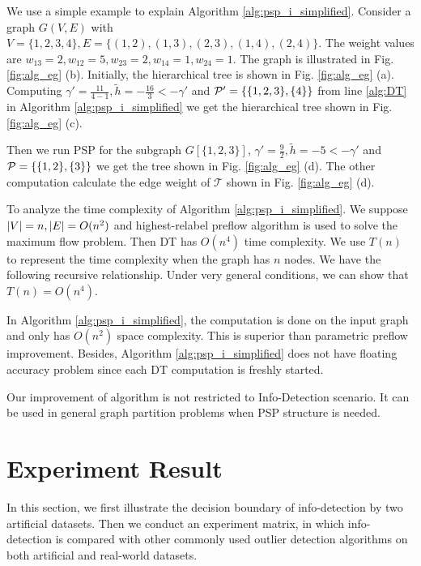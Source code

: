 \documentclass[runningheads]{llncs}
\begin{document}
\begin{example}
	We use a simple example to explain Algorithm \ref{alg:psp_i_simplified}. Consider a graph $G(V, E)$ with $V=\{1,2,3,4\}, E=\{(1,2),(1,3),(2,3),(1,4),(2,4)\}$. The weight values are $w_{13}=2, w_{12}=5, w_{23}=2, w_{14}=1, w_{24}=1$. The graph is illustrated
	in Fig. \ref{fig:alg_eg} (b). Initially, the hierarchical tree is shown in Fig. \ref{fig:alg_eg} (a). Computing $\gamma' = \frac{11}{4-1}, \tilde{h} = -\frac{16}{3} < -\gamma' $ and $\P' = \{\{1,2,3\},\{4\}\}$ from line \ref {alg:DT} in Algorithm \ref{alg:psp_i_simplified} we get the hierarchical tree shown in Fig. \ref{fig:alg_eg} (c).
	
	Then we run PSP for the subgraph $G[\{1,2,3\}]$, $\gamma' = \frac{9}{2}, \tilde{h} = -5 < -\gamma'$ and $\P= \{\{1,2\},\{3\}\}$ we get the tree shown in Fig. \ref{fig:alg_eg} (d). The other computation calculate the edge weight of $\mathcal{T}$ shown in Fig. \ref{fig:alg_eg} (d).
\end{example}		

To analyze the time complexity of Algorithm \ref{alg:psp_i_simplified}. We suppose $\abs{V} = n, \abs{E} = O(n^2)$ and highest-relabel preflow algorithm is used to solve the maximum flow problem. Then DT has $O(n^4)$ time complexity. 
We use $T(n)$ to represent the time complexity when the graph has $n$ nodes. We have the following recursive relationship. Under very general conditions, we can show that $T(n) = O(n^4)$. 

In Algorithm \ref{alg:psp_i_simplified}, the computation is done on the input graph and only has $O(n^2)$ space complexity. This is superior than parametric preflow improvement. Besides, Algorithm \ref{alg:psp_i_simplified} does not have floating accuracy problem since each DT computation is freshly started. 

Our improvement of algorithm is not restricted to Info-Detection scenario. It can be used in general graph partition problems when PSP structure is needed.

\section{Experiment Result}\label{sec:Experiemt}
In this section, we first illustrate the decision boundary of info-detection by two artificial datasets. Then we conduct an experiment matrix, in which info-detection is compared with other commonly used outlier detection algorithms on both artificial and real-world datasets.
\end{document}
